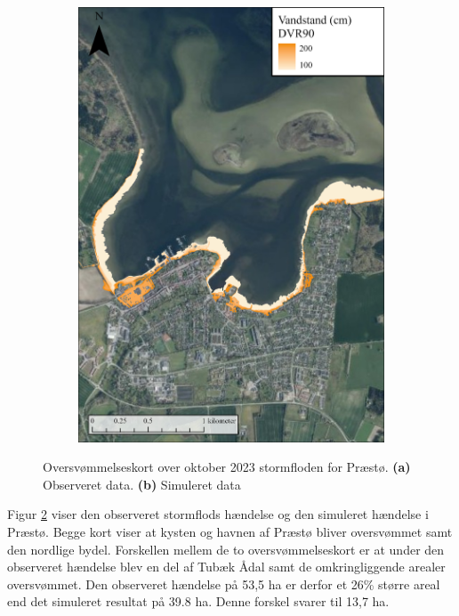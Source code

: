 \begin{figure}[H]
\begin{subfigure}[t]{0.5\textwidth}
        \includegraphics[width=0.95\linewidth]{images/Resultater/2023Model/2023 model_praestoe.jpg}
        \caption{}
        \label{Subfig: Model Præstø}
    \end{subfigure}
    \caption{Oversvømmelseskort over oktober 2023 stormfloden for Præstø. \textbf{(a)} Observeret data. \textbf{(b)} Simuleret data}
    \label{Figur: Målt & simuleret Præstø}
\end{figure}
Figur \ref{Figur: Målt & simuleret Præstø} viser den observeret stormflods hændelse og den simuleret hændelse i Præstø. Begge kort viser at kysten og havnen af Præstø bliver oversvømmet samt den nordlige bydel. Forskellen mellem de to oversvømmelseskort er at under den observeret hændelse blev en del af Tubæk Ådal samt de omkringliggende arealer oversvømmet. Den observeret hændelse på 53,5 ha er derfor et 26\% større areal end det simuleret resultat på 39.8 ha. Denne forskel svarer til 13,7 ha.\\


